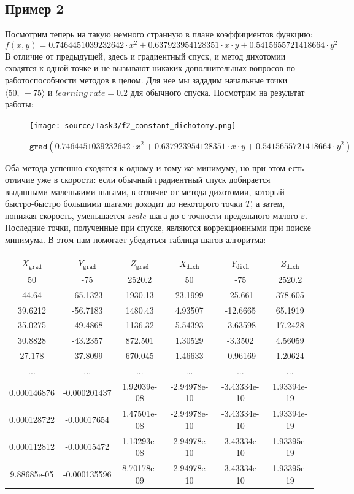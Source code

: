 \documentclass[12pt, a4paper, oneside, final]{article}
\begin{document}
	\subsection*{Пример 2}
	Посмотрим теперь на такую немного странную в плане коэффициентов функцию:
	\[
		f(x, y) = 0.7464451039232642 \cdot x^{2} + 0.637923954128351 \cdot x \cdot y + 0.5415655721418664 \cdot y^{2}
	\]
	В отличие от предыдущей, здесь и градиентный спуск, и метод дихотомии сходятся к одной точке и не вызывают никаких дополнительных вопросов по работоспособности методов в целом. Для нее мы зададим начальные точки $\langle 50, ~ -75\rangle$ и $learning~rate = 0.2$ для обычного спуска. Посмотрим на результат работы:
	\begin{figure}[H]
		\centering
		\texttt{[image: source/Task3/f2\_constant\_dichotomy.png]}
		\caption{$\texttt{grad}(0.7464451039232642 \cdot x^{2} + 0.637923954128351 \cdot x \cdot y + 0.5415655721418664 \cdot y^{2})$}
	\end{figure}
	Оба метода успешно сходятся к одному и тому же минимуму, но при этом есть отличие уже в скорости: если обычный градиентный спуск добирается выданными маленькими шагами, в отличие от метода дихотомии, который быстро-быстро большими шагами доходит до некоторого точки $T$, а затем, понижая скорость, уменьшается $scale$ шага до с точности предельного малого $\varepsilon$. Последние точки, полученные при спуске, являются коррекционными при поиске минимума. В этом нам помогает убедиться таблица шагов алгоритма:
	\begin{table}[H]
		\centering
		\begin{tabular}{|c|c|c|c|c|c|}
			$X_{\texttt{grad}}$ & $Y_{\texttt{grad}}$ & $Z_{\texttt{grad}}$ & $X_{\texttt{dich}}$ & $Y_{\texttt{dich}}$ & $Z_{\texttt{dich}}$ \\ \hline
			50 & -75 & 2520.2 & 50 & -75 & 2520.2 \\
			44.64 & -65.1323 & 1930.13 & 23.1999 & -25.661 & 378.605 \\
			39.6212 & -56.7183 & 1480.43 & 4.93507 & -12.6665 & 65.1919 \\
			35.0275 & -49.4868 & 1136.32 & 5.54393 & -3.63598 & 17.2428 \\
			30.8828 & -43.2357 & 872.501 & 1.30529 & -3.3502 & 4.56059 \\
			27.178 & -37.8099 & 670.045 & 1.46633 & -0.96169 & 1.20624 \\
			... & ... & ... & ... & ... & ... \\
			0.000146876 & -0.000201437 & 1.92039e-08 & -2.94978e-10 & -3.43334e-10 & 1.93394e-19 \\
			0.000128722 & -0.00017654 & 1.47501e-08 & -2.94978e-10 & -3.43334e-10 & 1.93394e-19 \\
			0.000112812 & -0.00015472 & 1.13293e-08 & -2.94978e-10 & -3.43334e-10 & 1.93395e-19 \\
			9.88685e-05 & -0.000135596 & 8.70178e-09 & -2.94978e-10 & -3.43334e-10 & 1.93395e-19
		\end{tabular}
	\end{table}
\end{document}
